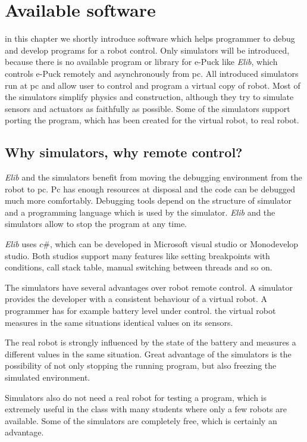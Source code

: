 \chapter{Available software} \label{chap:software}
  in this chapter we shortly introduce software which helps programmer
  to debug and develop programs for a robot control. 
  Only simulators will be introduced, because 
  there is no available program or library for e-Puck like {\it Elib},
  which controls e-Puck remotely and asynchronously from pc.
  All introduced simulators run at pc and allow user to control and program a virtual copy of robot.
  Most of the simulators simplify physics and construction, although they try to simulate sensors
  and actuators as faithfully as possible. Some of the simulators support porting the program,
  which has been created for the virtual robot, to real robot.
  
\section{Why simulators, why remote control?}
  {\it Elib} and the simulators benefit from moving the debugging environment from the robot to pc.
  Pc has enough resources at disposal and the code can be debugged much more comfortably. Debugging
  tools depend on the structure of simulator and a programming language which is used by the simulator.
  {\it Elib} and the simulators allow to stop the program at any time.
  
  {\it Elib} uses $c\#$, which can be developed in Microsoft visual studio or Monodevelop studio.
  Both studios support many features like setting breakpoints with conditions, call stack table,
  manual switching between threads and so on.
  
  The simulators have several advantages over robot remote control.
  A simulator provides the developer with a consistent behaviour of a virtual robot.
  A programmer has for example battery level under control. 
  the virtual robot measures in the same situations identical values on its sensors. 
  
  The real robot is strongly influenced by the state of the battery
  and measures a different values in the same situation.
  Great advantage of the simulators is the possibility of not only stopping
  the running program, but also freezing the simulated environment. 
  
  Simulators also do not need a real robot for testing a program, which is extremely
  useful in the class with many students where only a few robots are available.
  Some of the simulators are completely free, which is certainly an advantage. 
  
